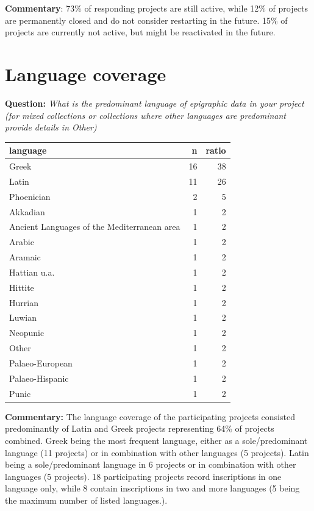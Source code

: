 \documentclass[
  12pt,
]{scrreprt}
\begin{document}
\textbf{Commentary}: 73\% of responding projects are still active, while
12\% of projects are permanently closed and do not consider restarting
in the future. 15\% of projects are currently not active, but might be
reactivated in the future.

\hypertarget{language-coverage-1}{%
\section{Language coverage}\label{language-coverage-1}}

\textbf{Question:} \emph{What is the predominant language of epigraphic
data in your project (for mixed collections or collections where other
languages are predominant provide details in Other)}

\begin{longtable}[]{@{}lrr@{}}
\toprule
language & n & ratio \\
\midrule
\endhead
Greek & 16 & 38 \\
Latin & 11 & 26 \\
Phoenician & 2 & 5 \\
Akkadian & 1 & 2 \\
Ancient Languages of the Mediterranean area & 1 & 2 \\
Arabic & 1 & 2 \\
Aramaic & 1 & 2 \\
Hattian u.a. & 1 & 2 \\
Hittite & 1 & 2 \\
Hurrian & 1 & 2 \\
Luwian & 1 & 2 \\
Neopunic & 1 & 2 \\
Other & 1 & 2 \\
Palaeo-European & 1 & 2 \\
Palaeo-Hispanic & 1 & 2 \\
Punic & 1 & 2 \\
\bottomrule
\end{longtable}

\textbf{Commentary:} The language coverage of the participating projects
consisted predominantly of Latin and Greek projects representing 64\% of
projects combined. Greek being the most frequent language, either as a
sole/predominant language (11 projects) or in combination with other
languages (5 projects). Latin being a sole/predominant language in 6
projects or in combination with other languages (5 projects). 18
participating projects record inscriptions in one language only, while 8
contain inscriptions in two and more languages (5 being the maximum
number of listed languages.).
\end{document}
